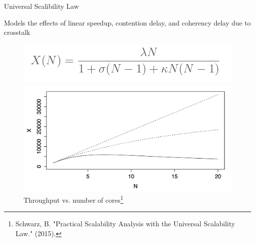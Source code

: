 \documentclass[10pt]{beamer}
\begin{document}
\begin{frame}{Universal Scalibility Law}
	\begin{outline}
		\1 Models the effects
		of linear speedup, contention delay, and coherency delay due to crosstalk
		\begin{figure}
			\centering
			\includegraphics[width=0.5\linewidth]{figures/usl_formula.png}
			
			\includegraphics[width=0.72\linewidth]{figures/usl.png}
			\caption{Throughput vs. number of cores\footnote{Schwarz, B. "Practical Scalability Analysis with the Universal Scalability Law." (2015).}}				
		\end{figure}

	\end{outline}
\end{frame}
\end{document}
